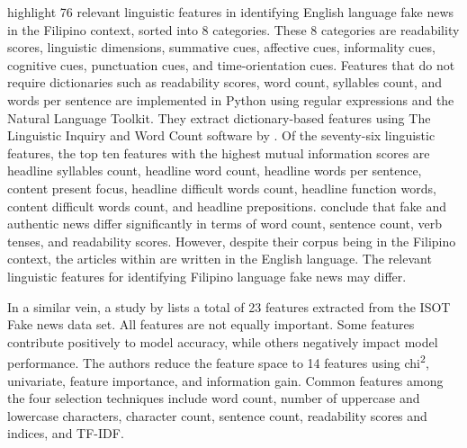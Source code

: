  highlight 76 relevant linguistic features in identifying English language fake news in the Filipino context, sorted into 8 categories. These 8 categories are readability scores, linguistic dimensions, summative cues, affective cues, informality cues, cognitive cues, punctuation cues, and time-orientation cues. Features that do not require dictionaries such as readability scores, word count, syllables count, and words per sentence are implemented in Python using regular expressions and the Natural Language Toolkit. They extract dictionary-based features using The Linguistic Inquiry and Word Count software by . Of the seventy-six linguistic features, the top ten features with the highest mutual information scores are headline syllables count, headline word count, headline words per sentence, content present focus, headline difficult words count, headline function words, content difficult words count, and headline prepositions.  conclude that fake and authentic news differ significantly in terms of word count, sentence count, verb tenses, and readability scores. However, despite their corpus being in the Filipino context, the articles within are written in the English language. The relevant linguistic features for identifying Filipino language fake news may differ.

In a similar vein, a study by  lists a total of 23 features extracted from the ISOT Fake news data set. All features are not equally important. Some features contribute positively to model accuracy, while others negatively impact model performance. The authors reduce the feature space to 14 features using chi\textsuperscript{2}, univariate, feature importance, and information gain. Common features among the four selection techniques include word count, number of uppercase and lowercase characters, character count, sentence count, readability scores and indices, and TF-IDF.

